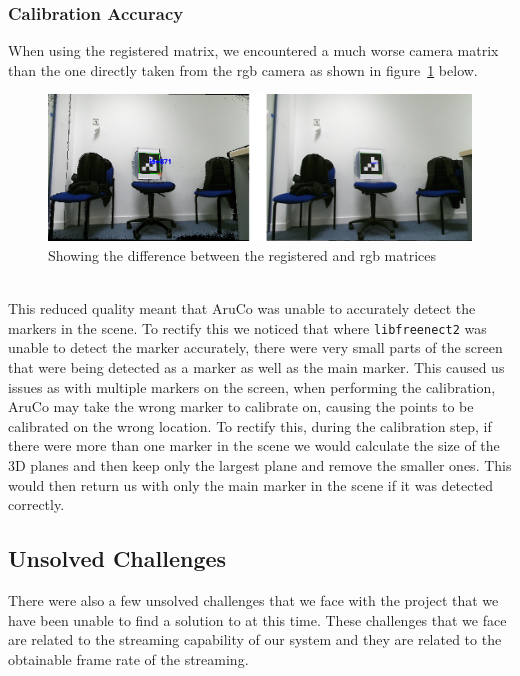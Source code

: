 \documentclass{article}
\begin{document}
\subsubsection{Calibration Accuracy}
When using the registered matrix, we encountered a much worse camera matrix than the one directly taken from the rgb camera as shown in figure~\ref{fig:registeredaccuracy} below.
\begin{figure}[h]
  \centering
  \includegraphics[scale=0.7]{registeredunregisteredview}
  \caption{Showing the difference between the registered and rgb matrices}
  \label{fig:registeredaccuracy}
\end{figure}
\\
This reduced quality meant that AruCo was unable to accurately detect the markers in the scene. To rectify this we noticed that where \texttt{libfreenect2} was unable to detect the marker accurately, there were very small parts of the screen that were being detected as a marker as well as the main marker. This caused us issues as with multiple markers on the screen, when performing the calibration, AruCo may take the wrong marker to calibrate on, causing the points to be calibrated on the wrong location. To rectify this, during the calibration step, if there were more than one marker in the scene we would calculate the size of the 3D planes and then keep only the largest plane and remove the smaller ones. This would then return us with only the main marker in the scene if it was detected correctly.
\subsection{Unsolved Challenges}
There were also a few unsolved challenges that we face with the project that we have been unable to find a solution to at this time. These challenges that we face are related to the streaming capability of our system and they are related to the obtainable frame rate of the streaming.
\end{document}
